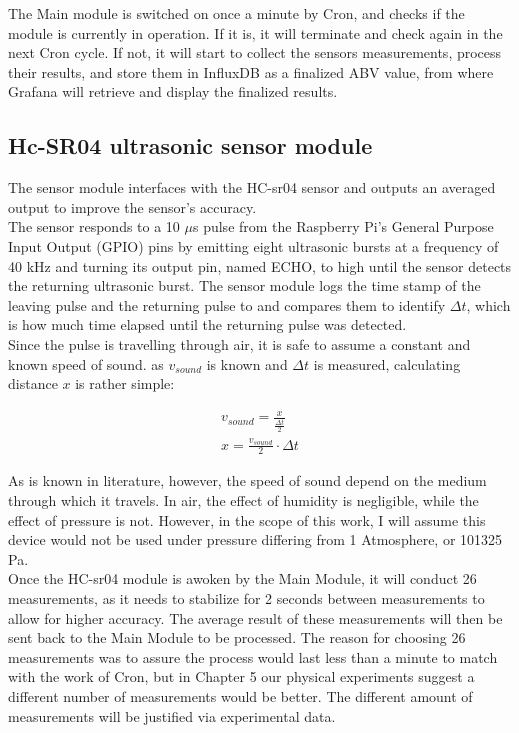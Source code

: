 \documentclass[twoside]{ctuthesis}
\theoremstyle{plain}
\theoremstyle{definition}
\theoremstyle{note}
\begin{document}
The Main module is switched on once a minute by Cron, and checks if the module is currently in operation. If it is, it will terminate and check again in the next Cron cycle. If not, it will start to collect the sensors measurements, process their results, and store them in InfluxDB as a finalized ABV value, from where Grafana will retrieve and display the finalized results.

\subsection{Hc-SR04 ultrasonic sensor module}
The sensor module interfaces with the HC-sr04 sensor and outputs an averaged output to improve the sensor's accuracy.\\
The sensor responds to a 10 $\mu$s pulse from the Raspberry Pi's General Purpose Input Output (GPIO) pins by emitting eight ultrasonic bursts at a frequency of 40 kHz and turning its output pin, named ECHO, to high until the sensor detects the returning ultrasonic burst. The sensor module logs the time stamp of the leaving pulse and the returning pulse to and compares them to identify $\Delta t$, which is how much time elapsed until the returning pulse was detected.\\

Since the pulse is travelling through air, it is safe to assume a constant and known speed of sound. as $v_{sound}$ is known and $\Delta t$ is measured, calculating distance $x$ is rather simple:

\begin{gather} \nonumber
v_{sound} = \frac{x}{\frac{\Delta t}{2}}\\
x = \frac{v_{sound}}{2}\cdot \Delta t
\end{gather}

As is known in literature, however, the speed of sound depend on the medium through which it travels. In air, the effect of humidity is negligible, while the effect of pressure is not\cite{Sound}. However, in the scope of this work, I will assume this device would not be used under pressure differing from 1 Atmosphere, or 101325 Pa.\\
Once the HC-sr04 module is awoken by the Main Module, it will conduct 26 measurements, as it needs to stabilize for 2 seconds between measurements to allow for higher accuracy. The average result of these measurements will then be sent back to the Main Module to be processed. The reason for choosing 26 measurements was to assure the process would last less than a minute to match with the work of Cron, but in Chapter 5 our physical experiments suggest a different number of measurements would be better. The different amount of measurements will be justified via experimental data.
\end{document}
